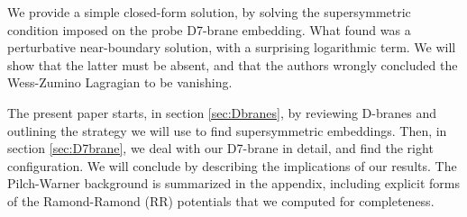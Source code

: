 We provide a simple closed-form solution, by solving the supersymmetric condition imposed on the probe D7-brane embedding. What \cite{Albash:2011nw} found was a perturbative near-boundary solution, with a surprising logarithmic term. We will show that the latter must be absent, and that the authors wrongly concluded the Wess-Zumino Lagragian to be vanishing.

The present paper starts, in section \ref{sec:Dbranes}, by reviewing D-branes and outlining the strategy we will use to find supersymmetric embeddings. Then, in section \ref{sec:D7brane}, we deal with our D7-brane in detail, and find the right configuration. We will conclude by describing the implications of our results. The Pilch-Warner background is summarized in the appendix, including explicit forms of the Ramond-Ramond (RR) potentials that we computed for completeness. 




